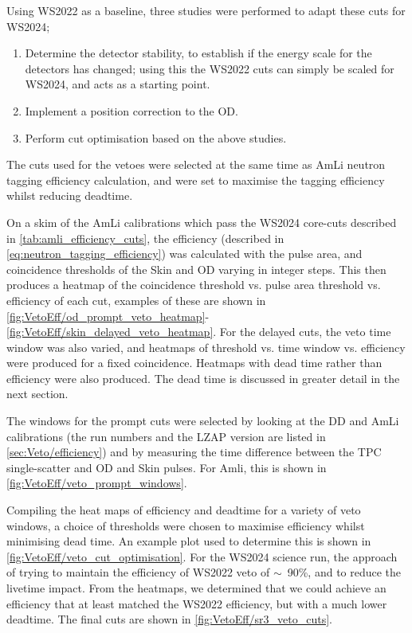 Using WS2022 as a baseline, three studies were performed to adapt these cuts for WS2024;
\begin{enumerate}
	\item Determine the detector stability, to establish if the energy scale for the detectors has changed; using this the WS2022 cuts can simply be scaled for WS2024, and acts as a starting point.
	\item Implement a position correction to the OD.
	\item Perform cut optimisation based on the above studies.
\end{enumerate}
The cuts used for the vetoes were selected at the same time as AmLi neutron tagging efficiency calculation, and were set to maximise the tagging efficiency whilst reducing deadtime.

On a skim of the AmLi calibrations which pass the WS2024 core-cuts described in \autoref{tab:amli_efficiency_cuts}, the efficiency (described in \autoref{eq:neutron_tagging_efficiency}) was calculated with the pulse area, and coincidence thresholds of the Skin and OD varying in integer steps.
This then produces a heatmap of the coincidence threshold vs. pulse area threshold vs. efficiency of each cut, examples of these are shown in \autoref{fig:VetoEff/od_prompt_veto_heatmap}-\ref{fig:VetoEff/skin_delayed_veto_heatmap}.
For the delayed cuts, the veto time window was also varied, and heatmaps of threshold vs. time window vs. efficiency were produced for a fixed coincidence. Heatmaps with dead time rather than efficiency were also produced. The dead time is discussed in greater detail in the next section.

The windows for the prompt cuts were selected by looking at the DD and AmLi calibrations (the run numbers and the LZAP version are listed in \autoref{sec:Veto/efficiency}) and by measuring the time difference between the TPC single-scatter and OD and Skin pulses.
For Amli, this is shown in \autoref{fig:VetoEff/veto_prompt_windows}.

Compiling the heat maps of efficiency and deadtime for a variety of veto windows, a choice of thresholds were chosen to maximise efficiency whilst minimising dead time.
An example plot used to determine this is shown in \autoref{fig:VetoEff/veto_cut_optimisation}.
For the WS2024 science run, the approach of trying to maintain the efficiency of WS2022 veto of $\sim$~90\%, and to reduce the livetime impact.
From the heatmaps, we determined that we could achieve an efficiency that at least matched the WS2022 efficiency, but with a much lower deadtime.
The final cuts are shown in \autoref{fig:VetoEff/sr3_veto_cuts}.

